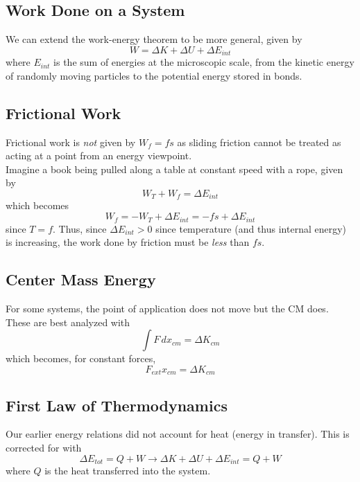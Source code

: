 \documentclass[../PhysicsFormulae.tex]{subfiles}
\begin{document}
\subsection{Work Done on a System}
We can extend the work-energy theorem to be more general, given by
\[ W = \Delta K + \Delta U + \Delta E_{int} \]
where $E_{int}$ is the sum of energies at the microscopic scale, from the kinetic energy of randomly moving particles to the potential energy stored in bonds.
 
\subsection{Frictional Work}
Frictional work is \textit{not} given by $W_f = fs$ as sliding friction cannot be treated as acting at a point from an energy viewpoint.\\
Imagine a book being pulled along a table at constant speed with a rope, given by
\[ W_T + W_f = \Delta E_{int} \]
which becomes
\[ W_f = -W_T + \Delta E_{int} = -fs + \Delta E_{int} \]
since $T = f$. Thus, since $\Delta E_{int} > 0$ since temperature (and thus internal energy) is increasing, the work done by friction must be \textit{less} than $fs$. 

\subsection{Center Mass Energy}
For some systems, the point of application does not move but the CM does. These are best analyzed with
\[ \int F \,dx_{cm} = \Delta K_{cm} \]
which becomes, for constant forces, 
\[ F_{ext}x_{cm} = \Delta K_{cm} \]

\subsection{First Law of Thermodynamics}
Our earlier energy relations did not account for heat (energy in transfer). This is corrected for with
\[ \Delta E_{tot} = Q + W \rightarrow \Delta K + \Delta U + \Delta E_{int} = Q + W\]
where $Q$ is the heat transferred into the system. 
\end{document}
